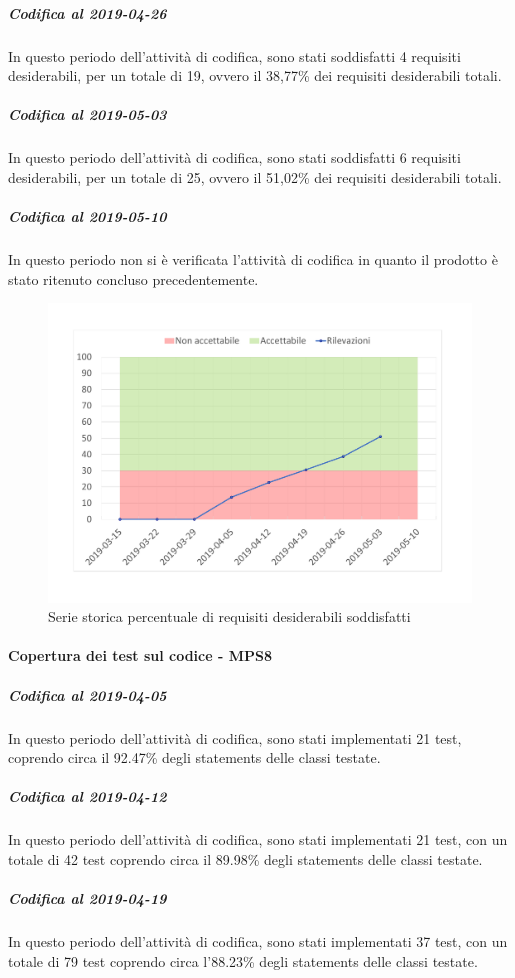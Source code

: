 \subparagraph{Codifica al 2019-04-26}
In questo periodo dell'attività di codifica, sono stati soddisfatti 4 requisiti desiderabili, per un totale di 19, ovvero il 38,77\% dei requisiti desiderabili totali.

\subparagraph{Codifica al 2019-05-03}
In questo periodo dell'attività di codifica, sono stati soddisfatti 6 requisiti desiderabili, per un totale di 25, ovvero il 51,02\% dei requisiti desiderabili totali.

\subparagraph{Codifica al 2019-05-10}
In questo periodo non si è verificata l'attività di codifica in quanto il prodotto è stato ritenuto concluso precedentemente.

\begin{figure}[H]
	\centering
	\includegraphics[scale=0.6]{images/resoconto/MPS7Chart.pdf}
	\caption{Serie storica percentuale di requisiti desiderabili soddisfatti}	
\end{figure}

\paragraph{Copertura dei test sul codice - MPS8}
\subparagraph{Codifica al 2019-04-05}
In questo periodo dell'attività di codifica, sono stati implementati 21 test, coprendo circa il 92.47\% degli statements delle classi testate.

\subparagraph{Codifica al 2019-04-12}
In questo periodo dell'attività di codifica, sono stati implementati 21 test, con un totale di 42 test coprendo circa il 89.98\% degli statements delle classi testate.

\subparagraph{Codifica al 2019-04-19}
In questo periodo dell'attività di codifica, sono stati implementati 37 test, con un totale di 79 test coprendo circa l'88.23\% degli statements delle classi testate.


